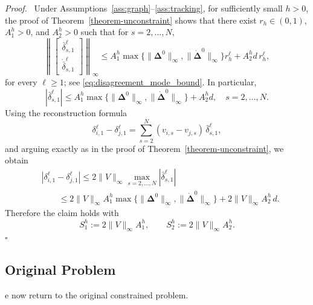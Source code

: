 \documentclass[letterpaper,journal]{IEEEtran}
\newenvironment{proof}{\par\noindent\textit{Proof.}\ }{\hfill$\square$\par}
\begin{document}
\begin{proof}
Under Assumptions~\ref{ass:graph}--\ref{ass:tracking}, for sufficiently small \(h>0\), the proof of Theorem~\ref{theorem-unconstraint} shows that there exist \(r_h\in(0,1)\), \(A_1^h>0\), and \(A_2^h>0\) such that for $s=2,\dots,N$,
\[
\left\|
\begin{bmatrix}
\bar{\delta}_{s,1}^\ell \\[5pt]
\dot{\bar{\delta}}_{s,1}^\ell
\end{bmatrix}
\right\|_\infty
\le
A_1^h \max\{\|\bm{\Delta}^0\|_\infty,\|\dot{\bm{\Delta}}^0\|_\infty\} r_h^\ell
+
A_2^h d\, r_h^\ell,
\]
for every \(\ell\ge 1\); see \eqref{eq:disagreement_mode_bound}. In particular,
\[
|\bar{\delta}_{s,1}^\ell|
\le
A_1^h \max\{\|\bm{\Delta}^0\|_\infty,\|\dot{\bm{\Delta}}^0\|_\infty\}
+
A_2^h d,
\quad s=2,\dots,N.
\]
Using the reconstruction formula
\[
\delta_{i,1}^\ell-\delta_{j,1}^\ell
=
\sum_{s=2}^{N}(v_{i,s}-v_{j,s})\,\bar{\delta}_{s,1}^{\ell},
\]
and arguing exactly as in the proof of Theorem~\ref{theorem-unconstraint}, we obtain
\[
\begin{split}
&|\delta_{i,1}^{\ell}-\delta_{j,1}^{\ell}|
\le
2\|V\|_\infty \max_{s=2,\dots,N} |\bar{\delta}_{s,1}^{\ell}|
\\
&\qquad\le
2\|V\|_\infty A_1^h
\max\{\|\bm{\Delta}^0\|_\infty,\|\dot{\bm{\Delta}}^0\|_\infty\}
+
2\|V\|_\infty A_2^h\, d.
\end{split}
\]
Therefore the claim holds with
\[
S_1^h:=2\|V\|_\infty A_1^h,
\qquad
S_2^h:=2\|V\|_\infty A_2^h.
\]
\end{proof}


\subsection{Original Problem}\label{sec:original}

e now return to the original constrained problem.
\end{document}
